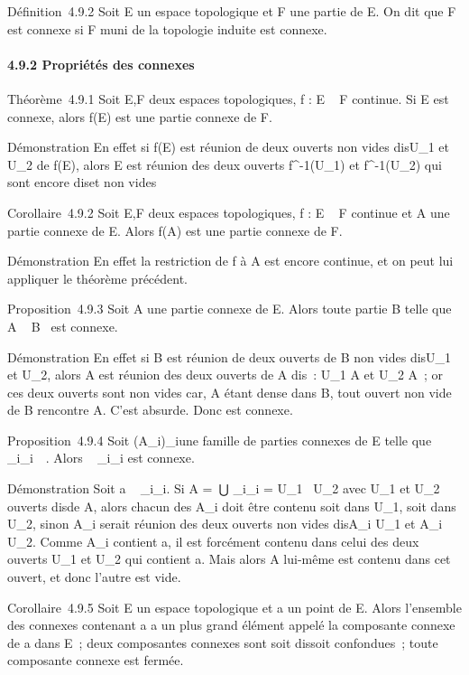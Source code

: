\documentclass[]{article}
\begin{document}
Définition~4.9.2 Soit E un espace topologique et F une partie de E. On
dit que F est connexe si F muni de la topologie induite est connexe.

\paragraph{4.9.2 Propriétés des connexes}

Théorème~4.9.1 Soit E,F deux espaces topologiques, f : E \rightarrow~ F continue.
Si E est connexe, alors f(E) est une partie connexe de F.

Démonstration En effet si f(E) est réunion de deux ouverts non vides
dis\jmathoints U\_1 et U\_2 de f(E), alors E est réunion des
deux ouverts f^-1(U\_1) et
f^-1(U\_2) qui sont encore dis\jmathoints et non vides

Corollaire~4.9.2 Soit E,F deux espaces topologiques, f : E \rightarrow~ F continue
et A une partie connexe de E. Alors f(A) est une partie connexe de F.

Démonstration En effet la restriction de f à A est encore continue, et
on peut lui appliquer le théorème précédent.

Proposition~4.9.3 Soit A une partie connexe de E. Alors toute partie B
telle que A \subset~ B \subset~\overlineA est connexe.

Démonstration En effet si B est réunion de deux ouverts de B non vides
dis\jmathoints U\_1 et U\_2, alors A est réunion des deux
ouverts de A dis\jmathoints~: U\_1 \bigcap A et U\_2 \bigcap A~; or ces
deux ouverts sont non vides car, A étant dense dans B, tout ouvert non
vide de B rencontre A. C'est absurde. Donc \overlineA
est connexe.

Proposition~4.9.4 Soit (A\_i)\_i\inI une famille de
parties connexes de E telle que
\⋂ ~
\_i\inIA\_i\neq~\varnothing~. Alors
\⋃ ~
\_i\inIA\_i est connexe.

Démonstration Soit a
\in\⋂ ~
\_i\inIA\_i. Si A =\
⋃  \_i\inIA\_i = U\_1~ \cup
U\_2 avec U\_1 et U\_2 ouverts dis\jmathoints de A,
alors chacun des A\_i doit être contenu soit dans U\_1,
soit dans U\_2, sinon A\_i serait réunion des deux
ouverts non vides dis\jmathoints A\_i \bigcap U\_1 et A\_i
\bigcap U\_2. Comme A\_i contient a, il est forcément contenu
dans celui des deux ouverts U\_1 et U\_2 qui contient a.
Mais alors A lui-même est contenu dans cet ouvert, et donc l'autre est
vide.

Corollaire~4.9.5 Soit E un espace topologique et a un point de E. Alors
l'ensemble des connexes contenant a a un plus grand élément appelé la
composante connexe de a dans E~; deux composantes connexes sont soit
dis\jmathointes soit confondues~; toute composante connexe est fermée.
\end{document}
